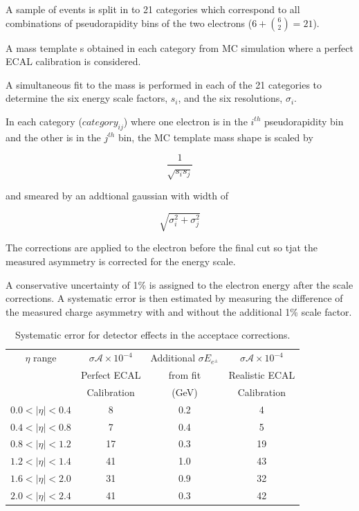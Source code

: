 A sample of \Zee events is  split in to 21 categories which correspond to all
combinations of pseudorapidity bins of the two electrons ($6+\binom{6}{2} = 21$).

A mass template s obtained in each category from \ac{MC} simulation where a
perfect \ac{ECAL} calibration is considered.

A simultaneous fit to the \Zee mass is performed in each of the 21 categories
to determine the six energy scale factors, $s_i$, and the six resolutions, 
$\sigma_i$.

In each category ($category_{ij}$) where one electron is in the $i^{th}$
pseudorapidity bin and the other is in the $j^{th}$ bin, the \ac{MC} template
mass shape is scaled by 

\begin{equation}
    \frac{1}{\sqrt{s_i s_j} } 
\end{equation}

and smeared by an addtional gaussian with width of 

\begin{equation}
    \sqrt{\sigma_i^2+\sigma_j^2}
\end{equation}


The corrections are applied to the electron before the final \Pt cut so tjat
the measured asymmetry is corrected for the energy scale.

A conservative uncertainty of \unit{1}{\% } is assigned to the electron energy
after the scale corrections. A systematic error is then estimated by measuring
the difference of the measured charge asymmetry with and without the additional
\unit{1}{\% } scale factor.

\begin{table}[htbp]
  \begin{center}
    \begin{tabular}{cccc}
    \toprule
$\eta$ range& $\sigma{\mathcal{A}} \times 10^{-4}$  & Additional $\sigma{E_{e^\pm}}$  & $\sigma{\mathcal{A}} \times 10^{-4}$ \\
& Perfect ECAL  & from fit  &  Realistic ECAL\\
& Calibration & (GeV) & Calibration \\
\midrule
$0.0<| \eta |<0.4$  &  8  & 0.2  &  4 \\
$0.4<| \eta |<0.8$  &  7  & 0.4  &  5\\
$0.8<| \eta |<1.2$  & 17  & 0.3  & 19\\
$1.2<| \eta |<1.4$  & 41  & 1.0  & 43\\
$1.6<| \eta |<2.0$  & 31  & 0.9  & 32 \\
$2.0<| \eta |<2.4$  & 41  & 0.3  & 42\\
    \bottomrule
    \end{tabular}
    \caption{\label{tab:acc}Systematic error for detector effects in the acceptace corrections.}
  \end{center}
\end{table}

